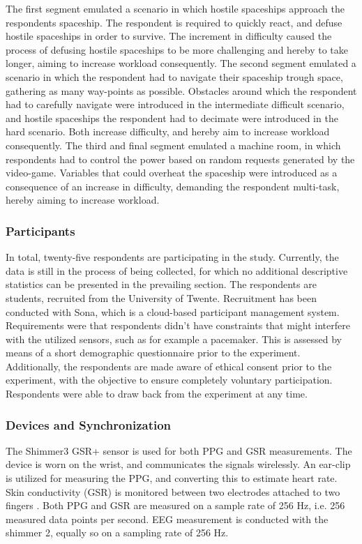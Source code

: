 \documentclass[12pt]{article}
\begin{document}
The first segment emulated a scenario in which hostile spaceships approach the respondents spaceship. The respondent is required to  quickly react, and defuse hostile spaceships in order to survive. The increment in difficulty caused the process of defusing hostile spaceships to be more challenging and hereby to take longer,  aiming to increase workload consequently. The second segment emulated a scenario in which the respondent had to navigate their spaceship trough space, gathering as many way-points as possible. Obstacles around which the respondent had to carefully navigate were introduced in the intermediate difficult scenario, and hostile spaceships the respondent had to decimate were introduced in the hard scenario. Both increase difficulty, and hereby aim to increase workload consequently. The third and final segment emulated a machine room, in which respondents had to control the power based on random requests generated by the video-game. Variables that could overheat the spaceship  were introduced as a consequence of an increase in difficulty, demanding the respondent multi-task, hereby aiming to increase workload. 

\subsubsection{Participants}
In total, twenty-five respondents are participating in the study. Currently, the data is still in the process of being collected, for which no additional descriptive statistics can be presented in the prevailing section. The respondents are students, recruited from the University of Twente. Recruitment has been conducted with Sona, which is a cloud-based participant management system. Requirements were that respondents didn't have constraints that might interfere with the utilized sensors, such as for example a pacemaker. This is assessed by means of a short demographic questionnaire prior to the experiment. Additionally, the respondents are made aware of ethical consent prior to the experiment, with the objective to ensure completely voluntary participation. Respondents were able to draw back from the experiment at any time. 

\subsubsection{Devices and Synchronization}
The Shimmer3 GSR+ sensor is used for both PPG and GSR measurements. The device is worn on the wrist, and communicates the signals wirelessly. An ear-clip is utilized for measuring the PPG, and converting this to estimate heart rate. Skin conductivity (GSR) is monitored between two electrodes attached to two fingers \cite{shimmer}. Both PPG and GSR are measured on a sample rate of 256 Hz, i.e. 256 measured data points per second. EEG measurement is conducted with the shimmer 2, equally so on a sampling rate of 256 Hz.
\end{document}
